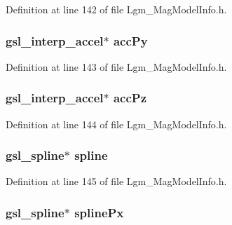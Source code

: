 Definition at line 142 of file Lgm\_\-MagModelInfo.h.\hypertarget{struct_lgm___mag_model_info_debd817de2dd24802efd42e4d61248bd}{
\subsubsection[{accPy}]{\setlength{\rightskip}{0pt plus 5cm}gsl\_\-interp\_\-accel$\ast$ {\bf accPy}}}
\label{struct_lgm___mag_model_info_debd817de2dd24802efd42e4d61248bd}




Definition at line 143 of file Lgm\_\-MagModelInfo.h.\hypertarget{struct_lgm___mag_model_info_3f81b52b8e022a147d3ded46c8eae116}{
\subsubsection[{accPz}]{\setlength{\rightskip}{0pt plus 5cm}gsl\_\-interp\_\-accel$\ast$ {\bf accPz}}}
\label{struct_lgm___mag_model_info_3f81b52b8e022a147d3ded46c8eae116}




Definition at line 144 of file Lgm\_\-MagModelInfo.h.\hypertarget{struct_lgm___mag_model_info_a4a622517a6af76ad0ff2c6f10465fdd}{
\subsubsection[{spline}]{\setlength{\rightskip}{0pt plus 5cm}gsl\_\-spline$\ast$ {\bf spline}}}
\label{struct_lgm___mag_model_info_a4a622517a6af76ad0ff2c6f10465fdd}




Definition at line 145 of file Lgm\_\-MagModelInfo.h.\hypertarget{struct_lgm___mag_model_info_7780e74c82195c308a42a01d815e05f9}{
\subsubsection[{splinePx}]{\setlength{\rightskip}{0pt plus 5cm}gsl\_\-spline$\ast$ {\bf splinePx}}}
\label{struct_lgm___mag_model_info_7780e74c82195c308a42a01d815e05f9}




